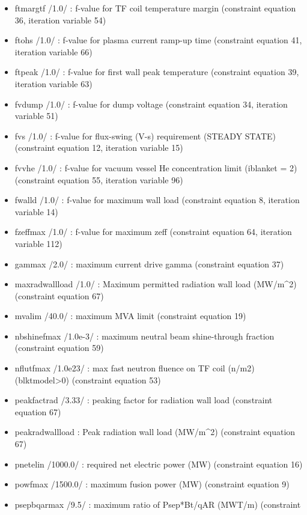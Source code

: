 \documentclass[
]{article}
\begin{document}
\begin{itemize}
\begin{itemize}
  \item
    ftmargtf /1.0/ : f-value for TF coil temperature margin (constraint
    equation 36, iteration variable 54)
  \item
    ftohs /1.0/ : f-value for plasma current ramp-up time (constraint
    equation 41, iteration variable 66)
  \item
    ftpeak /1.0/ : f-value for first wall peak temperature (constraint
    equation 39, iteration variable 63)
  \item
    fvdump /1.0/ : f-value for dump voltage (constraint equation 34,
    iteration variable 51)
  \item
    fvs /1.0/ : f-value for flux-swing (V-s) requirement (STEADY STATE)
    (constraint equation 12, iteration variable 15)
  \item
    fvvhe /1.0/ : f-value for vacuum vessel He concentration limit
    (iblanket = 2) (constraint equation 55, iteration variable 96)
  \item
    fwalld /1.0/ : f-value for maximum wall load (constraint equation 8,
    iteration variable 14)
  \item
    fzeffmax /1.0/ : f-value for maximum zeff (constraint equation 64,
    iteration variable 112)
  \item
    gammax /2.0/ : maximum current drive gamma (constraint equation 37)
  \item
    maxradwallload /1.0/ : Maximum permitted radiation wall load
    (MW/m\^{}2) (constraint equation 67)
  \item
    mvalim /40.0/ : maximum MVA limit (constraint equation 19)
  \item
    nbshinefmax /1.0e-3/ : maximum neutral beam shine-through fraction
    (constraint equation 59)
  \item
    nflutfmax /1.0e23/ : max fast neutron fluence on TF coil (n/m2)
    (blktmodel\textgreater0) (constraint equation 53)
  \item
    peakfactrad /3.33/ : peaking factor for radiation wall load
    (constraint equation 67)
  \item
    peakradwallload : Peak radiation wall load (MW/m\^{}2) (constraint
    equation 67)
  \item
    pnetelin /1000.0/ : required net electric power (MW) (constraint
    equation 16)
  \item
    powfmax /1500.0/ : maximum fusion power (MW) (constraint equation 9)
  \item
    psepbqarmax /9.5/ : maximum ratio of Psep*Bt/qAR (MWT/m) (constraint

\end{itemize}
\end{itemize}
\end{document}
